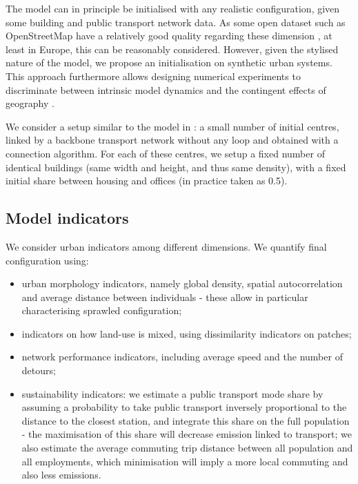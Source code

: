 \documentclass[letterpaper]{article}
\begin{document}
The model can in principle be initialised with any realistic configuration, given some building and public transport network data. As some open dataset such as OpenStreetMap have a relatively good quality regarding these dimension \citep{arsanjani2015quality}, at least in Europe, this can be reasonably considered. However, given the stylised nature of the model, we propose an initialisation on synthetic urban systems. This approach furthermore allows designing numerical experiments to discriminate between intrinsic model dynamics and the contingent effects of geography \citep{raimbault2019space}.

We consider a setup similar to the model in \cite{raimbault2014hybrid}: a small number of initial centres, linked by a backbone transport network without any loop and obtained with a connection algorithm. For each of these centres, we setup a fixed number of identical buildings (same width and height, and thus same density), with a fixed initial share between housing and offices (in practice taken as 0.5).



\subsection{Model indicators}

We consider urban indicators among different dimensions. We quantify final configuration using:

\begin{itemize}
	\item urban morphology indicators, namely global density, spatial autocorrelation and average distance between individuals \citep{raimbault2018calibration} - these allow in particular characterising sprawled configuration;
	\item indicators on how land-use is mixed, using dissimilarity indicators on patches;
	\item network performance indicators, including average speed and the number of detours;
	\item sustainability indicators: we estimate a public transport mode share by assuming a probability to take public transport inversely proportional to the distance to the closest station, and integrate this share on the full population - the maximisation of this share will decrease emission linked to transport; we also estimate the average commuting trip distance between all population and all employments, which minimisation will imply a more local commuting and also less emissions.
\end{itemize}
\end{document}
